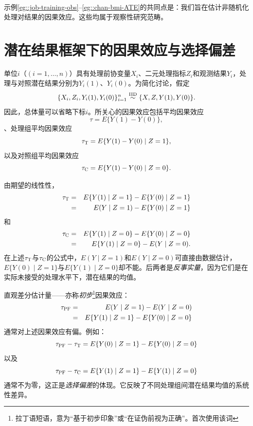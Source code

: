 示例\ref{eg::job-training-obs}–\ref{eg::chan-bmi-ATE}的共同点是：我们旨在估计非随机化处理对结果的因果效应。这些均属于观察性研究范畴。 
 
 
\section{潜在结果框架下的因果效应与选择偏差} 
 \label{sec::selection-bias-randomization}

 
 
单位$i$（$(i=1,\ldots, n)$）具有处理前协变量$X_i$、二元处理指标$Z_i$和观测结果$Y_i$，处理与对照潜在结果分别为$Y_i(1)$、$Y_i(0)$。为简化讨论，假定
$$
\{X_i, Z_i, Y_i(1),  Y_i(0)  \}_{i=1}^n \stackrel{\textup{IID}}{\sim} \{  X, Z, Y(1),  Y(0) \} .
$$
因此，总体量可以省略下标$i$。所关心的因果效应包括平均因果效应
$$
\tau = E\{  Y(1) - Y(0)  \},
$$
、处理组平均因果效应
$$
\tau_\textsc{T} =  E\{  Y(1) - Y(0)  \mid Z = 1 \},
$$
以及对照组平均因果效应
$$
\tau_\textsc{C} =  E\{  Y(1) - Y(0)  \mid Z = 0 \}. 
$$ 

由期望的线性性，
\begin{eqnarray*}
\tau_\textsc{T} &=&  E\{  Y(1)    \mid Z = 1 \} - E\{   Y(0)  \mid Z = 1 \}  \\
&=&  E(  Y    \mid Z = 1 ) - E\{   Y(0)  \mid Z = 1 \}
\end{eqnarray*}
和
\begin{eqnarray*}
 \tau_\textsc{C} &=&  E\{  Y(1)    \mid Z = 0 \} - E\{   Y(0)  \mid Z = 0 \} \\
 &=&  E\{  Y(1)    \mid Z = 0 \} - E(  Y   \mid Z = 0 ).
\end{eqnarray*}
在上述$\tau_\textsc{T} $与$\tau_\textsc{C} $的公式中，$E(Y    \mid Z = 1 ) $和$E(   Y   \mid Z = 0 ) $可直接由数据估计，$E\{   Y(0)  \mid Z = 1 \}$与$E\{  Y(1)    \mid Z = 0 \}$却不能。后两者是{\it 反事实量}，因为它们是在实际未接受的处理水平下，潜在结果的均值。 
 

直观差分估计量——亦称{\it 初步}\footnote{拉丁语短语，意为“基于初步印象”或“在证伪前视为正确”。\citet{holland1986statistics}首次使用该词}因果效应：
\begin{eqnarray*}
\tau_\textsc{PF} &=& E(  Y    \mid Z = 1 )  - E(   Y   \mid Z = 0 )   \\
&=& E\{  Y(1)    \mid Z = 1 \}  - E\{   Y(0)  \mid Z = 0 \} 
\end{eqnarray*}
通常对上述因果效应有偏。例如：
$$
 \tau_\textsc{PF} - \tau_\textsc{T} = E\{   Y(0)  \mid Z = 1 \} - E\{   Y(0)  \mid Z = 0 \} 
 $$
以及
$$
  \tau_\textsc{PF} - \tau_\textsc{C} =  E\{   Y(1)  \mid Z = 1 \} - E\{   Y(1)  \mid Z = 0 \} 
 $$
通常不为零，这正是{\it 选择偏差}的体现。它反映了不同处理组间潜在结果均值的系统性差异。 
 
